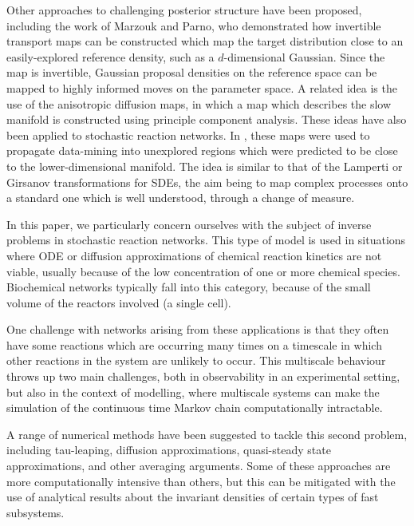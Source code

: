 \documentclass[final]{siamltex}
\begin{document}
Other approaches to challenging posterior structure have been
proposed, including the work of Marzouk and Parno\cite{parno2014transport}, who
demonstrated how invertible transport maps can be constructed which
map the target distribution close to an easily-explored reference
density, such as a $d$-dimensional Gaussian. Since the map is
invertible, Gaussian proposal densities on the reference space can be
mapped to highly informed moves on the parameter space. A related idea
is the use of the anisotropic diffusion maps\cite{singer2008non}, in
which a map which describes the slow manifold is constructed using
principle component analysis. These ideas have also been applied to
stochastic reaction
networks\cite{singer2009detecting,dsilva2016data}. In
\cite{chiavazzo2017intrinsic}, these maps were used to propagate
data-mining into unexplored regions which were predicted to be close
to the lower-dimensional manifold. The idea is similar to that of the
Lamperti or Girsanov transformations for SDEs\cite{flandrin2003stationarity,gardiner2009stochastic},  the aim being to map complex
processes onto a standard one which is well understood, through a
change of measure.

In this paper, we particularly concern ourselves with the subject of
inverse problems in stochastic reaction networks. This type of model
is used in situations where ODE or diffusion\cite{gillespie2000chemical}
approximations of chemical reaction kinetics are not viable, usually
because of the low concentration of one or more chemical
species\cite{gillespie1977exact}. Biochemical networks typically fall into
this category, because of the small volume of the reactors involved (a
single cell).

One challenge with networks arising from these applications is that
they often have some reactions which are occurring many times on a
timescale in which other reactions in the system are unlikely to
occur. This multiscale behaviour throws up two main challenges, both
in observability in an experimental setting, but also in the context
of modelling, where multiscale systems can make the simulation of the
continuous time Markov chain computationally intractable.

A range of numerical methods have been suggested to tackle this second
problem, including tau-leaping\cite{rathinam2003stiffness,cao2006efficient}, diffusion approximations\cite{erban2006gene,cotter2011constrained,cotter2016error}, quasi-steady state
approximations\cite{weinan2007nested,cao2005slow}, and other averaging
arguments\cite{cotter2016constrained}. Some of these approaches are more
computationally intensive than others, but this can be mitigated with the
use of analytical results about the invariant densities of certain
types of fast subsystems\cite{jahnke2007solving,anderson2010product,anderson2016product}.
\end{document}
